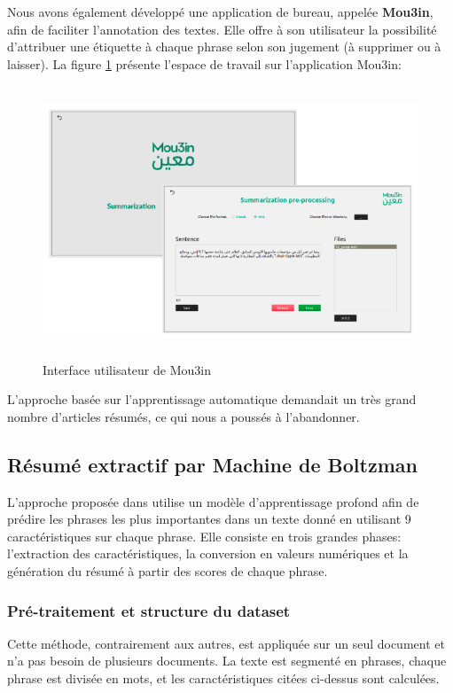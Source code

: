     Nous avons également développé une application de bureau, appelée \textbf{Mou3in}, afin de faciliter l'annotation des textes. Elle offre à son utilisateur la possibilité d'attribuer une étiquette à chaque phrase selon son jugement (à supprimer ou à laisser). La figure \ref{mou3in} présente l'espace de travail sur l'application \textquotedbl Mou3in\textquotedbl :
    \begin{figure}[H]
        \centering
        \includegraphics[height=230pt,width=370pt]{img/chapter4/mou3in/mou3in.png}
        \caption{Interface utilisateur de \textquotedbl Mou3in\textquotedbl}
        \label{mou3in}
    \end{figure}
    
    L'approche basée sur l'apprentissage automatique demandait un très grand nombre d'articles résumés, ce qui nous a poussés à l'abandonner.


\subsection{Résumé extractif par Machine de Boltzman}
L'approche proposée dans \cite{boltzman} utilise un modèle d'apprentissage profond afin de prédire les phrases les plus importantes dans un texte donné en utilisant 9 caractéristiques sur chaque phrase. Elle consiste en trois grandes phases: l'extraction des caractéristiques, la conversion en valeurs numériques et la génération du résumé à partir des scores de chaque phrase. 

    \subsubsection{Pré-traitement et structure du dataset}
    Cette méthode, contrairement aux autres, est appliquée sur un seul document et n'a pas besoin de plusieurs documents. La texte est segmenté en phrases, chaque phrase est divisée en mots, et les caractéristiques citées ci-dessus sont calculées.
    

